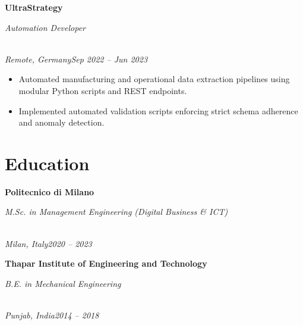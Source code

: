 \documentclass[a4paper,10pt]{article}
\newcommand{\role}[4]{\vspace{3pt}\noindent\hspace{0.6em}\parbox[t]{0.38\textwidth}{\raggedright\textbf{#1}}\hfill\parbox[t]{0.58\textwidth}{\raggedleft\textit{#2}}\\{\textit{#3}\hfill\textit{#4}}\vspace{1pt}}
\begin{document}
\role{UltraStrategy}{Automation Developer}{Remote, Germany}{Sep 2022 -- Jun 2023}
\begin{itemize}
\item Automated manufacturing and operational data extraction pipelines using modular Python scripts and REST endpoints.
\item Implemented automated validation scripts enforcing strict schema adherence and anomaly detection.
\end{itemize}

\section{Education}
\role{Politecnico di Milano}{M.Sc. in Management Engineering (Digital Business \& ICT)}{Milan, Italy}{2020 -- 2023}
\role{Thapar Institute of Engineering and Technology}{B.E. in Mechanical Engineering}{Punjab, India}{2014 -- 2018}
\end{document}
